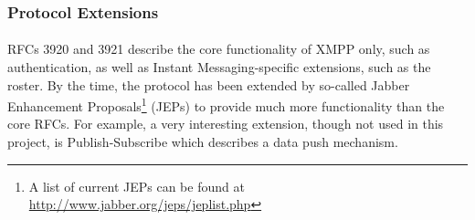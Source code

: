 \subsubsection{Protocol Extensions}
\paragraph{}
RFCs 3920 and 3921 describe the core functionality of XMPP only, such as authentication, as well as Instant Messaging-specific extensions, such as the roster. By the time, the protocol has been extended by so-called Jabber Enhancement Proposals\footnote{A list of current JEPs can be found at \href{http://www.jabber.org/jeps/jeplist.php}{http://www.jabber.org/jeps/jeplist.php}} (JEPs) to provide much more functionality than the core RFCs. For example, a very interesting extension, though not used in this project, is Publish-Subscribe \cite{jep0060} which describes a data push mechanism.
